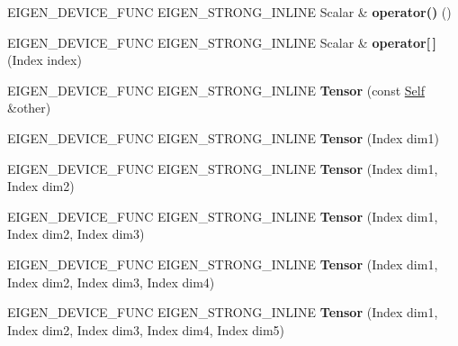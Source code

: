 \begin{DoxyCompactItemize}
E\+I\+G\+E\+N\+\_\+\+D\+E\+V\+I\+C\+E\+\_\+\+F\+U\+NC E\+I\+G\+E\+N\+\_\+\+S\+T\+R\+O\+N\+G\+\_\+\+I\+N\+L\+I\+NE Scalar \& {\bfseries operator()} ()
\item 
\mbox{\label{class_eigen_1_1_tensor_a19e911b02b2f4dc82e357952738510ed}} 
E\+I\+G\+E\+N\+\_\+\+D\+E\+V\+I\+C\+E\+\_\+\+F\+U\+NC E\+I\+G\+E\+N\+\_\+\+S\+T\+R\+O\+N\+G\+\_\+\+I\+N\+L\+I\+NE Scalar \& {\bfseries operator\mbox{[}$\,$\mbox{]}} (Index index)
\item 
\mbox{\label{class_eigen_1_1_tensor_a026fd6efc7b9c148b095072a4d162136}} 
E\+I\+G\+E\+N\+\_\+\+D\+E\+V\+I\+C\+E\+\_\+\+F\+U\+NC E\+I\+G\+E\+N\+\_\+\+S\+T\+R\+O\+N\+G\+\_\+\+I\+N\+L\+I\+NE {\bfseries Tensor} (const \hyperlink{class_eigen_1_1_tensor}{Self} \&other)
\item 
\mbox{\label{class_eigen_1_1_tensor_aee17d8f1e07d6acbbea1d596dc1d686a}} 
E\+I\+G\+E\+N\+\_\+\+D\+E\+V\+I\+C\+E\+\_\+\+F\+U\+NC E\+I\+G\+E\+N\+\_\+\+S\+T\+R\+O\+N\+G\+\_\+\+I\+N\+L\+I\+NE {\bfseries Tensor} (Index dim1)
\item 
\mbox{\label{class_eigen_1_1_tensor_aa374eb9affbb9eaca1dfb2ea1db5d9ef}} 
E\+I\+G\+E\+N\+\_\+\+D\+E\+V\+I\+C\+E\+\_\+\+F\+U\+NC E\+I\+G\+E\+N\+\_\+\+S\+T\+R\+O\+N\+G\+\_\+\+I\+N\+L\+I\+NE {\bfseries Tensor} (Index dim1, Index dim2)
\item 
\mbox{\label{class_eigen_1_1_tensor_abfe3743ba57e94dc52a2b4fa39452acb}} 
E\+I\+G\+E\+N\+\_\+\+D\+E\+V\+I\+C\+E\+\_\+\+F\+U\+NC E\+I\+G\+E\+N\+\_\+\+S\+T\+R\+O\+N\+G\+\_\+\+I\+N\+L\+I\+NE {\bfseries Tensor} (Index dim1, Index dim2, Index dim3)
\item 
\mbox{\label{class_eigen_1_1_tensor_a62b9266a774fa33f3db7035136be3fa6}} 
E\+I\+G\+E\+N\+\_\+\+D\+E\+V\+I\+C\+E\+\_\+\+F\+U\+NC E\+I\+G\+E\+N\+\_\+\+S\+T\+R\+O\+N\+G\+\_\+\+I\+N\+L\+I\+NE {\bfseries Tensor} (Index dim1, Index dim2, Index dim3, Index dim4)
\item 
\mbox{\label{class_eigen_1_1_tensor_ac7f7ba182eee8f6ff7d4b56ba3fd2ea1}} 
E\+I\+G\+E\+N\+\_\+\+D\+E\+V\+I\+C\+E\+\_\+\+F\+U\+NC E\+I\+G\+E\+N\+\_\+\+S\+T\+R\+O\+N\+G\+\_\+\+I\+N\+L\+I\+NE {\bfseries Tensor} (Index dim1, Index dim2, Index dim3, Index dim4, Index dim5)

\end{DoxyCompactItemize}
